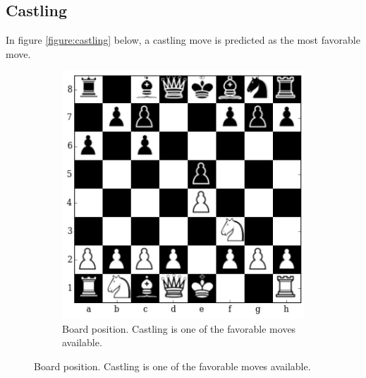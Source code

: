 \subsection{Castling}
In figure \ref{figure:castling} below, a castling move is predicted as the most 
favorable move.

\begin{figure}[H]
\hspace*{-0.5in}  
  \centering
    \begin{subfigure}[t]{\textwidth}
        \centering
        \includegraphics[scale=0.65]{img/best_moves/output_22_0.png}
        \caption{Board position. Castling is one of the favorable moves 
available.}
    \end{subfigure}%


\end{figure}
